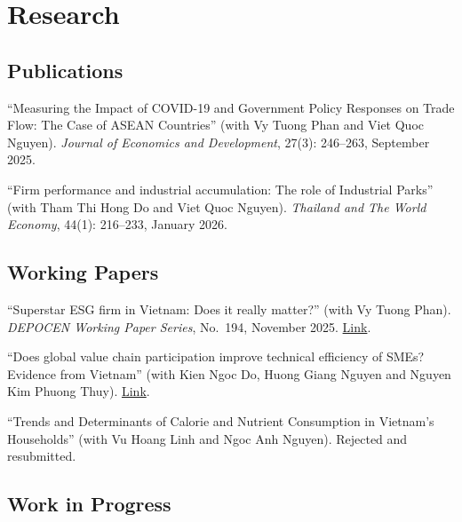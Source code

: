 \documentclass[10.5pt]{article}
\begin{document}

\section{Research}

\subsection{Publications}

\begin{enumerate}[label={[\arabic*]}]
\item ``Measuring the Impact of COVID-19 and Government Policy Responses on Trade Flow: The Case of ASEAN Countries'' (with Vy Tuong Phan and Viet Quoc Nguyen). \textit{Journal of Economics and Development}, 27(3): 246--263, September 2025.
\item ``Firm performance and industrial accumulation: The role of Industrial Parks'' (with Tham Thi Hong Do and Viet Quoc Nguyen). \textit{Thailand and The World Economy}, 44(1): 216--233, January 2026.
\end{enumerate}

\subsection{Working Papers}

\begin{enumerate}[label={[\arabic*]}]
\item ``Superstar ESG firm in Vietnam: Does it really matter?'' (with Vy Tuong Phan). \textit{DEPOCEN Working Paper Series}, No.\ 194, November 2025. \href{https://www.depocenwp.org/upload/pubs/2025/wp194_superstar_esg.pdf}{Link}.
\item ``Does global value chain participation improve technical efficiency of SMEs? Evidence from Vietnam'' (with Kien Ngoc Do, Huong Giang Nguyen and Nguyen Kim Phuong Thuy). \href{https://hal.science/hal-04528712/}{Link}.
\item ``Trends and Determinants of Calorie and Nutrient Consumption in Vietnam's Households'' (with Vu Hoang Linh and Ngoc Anh Nguyen). Rejected and resubmitted.
\end{enumerate}

\subsection{Work in Progress}
\end{document}
